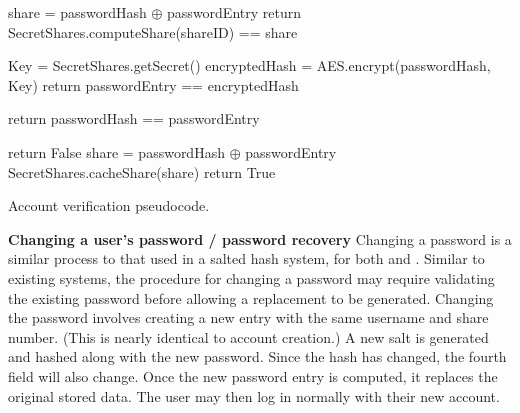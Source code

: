 \begin{algorithm}
\footnotesize
\begin{algorithmic}[1]

            \State share = passwordHash $\oplus$ passwordEntry 
            \State return SecretShares.computeShare(shareID) == share
        \Else {}

            \State {}
            \State Key = SecretShares.getSecret()
            \State encryptedHash = AES.encrypt(passwordHash, Key)
            \State return passwordEntry == encryptedHash

        \EndIf
        \vspace{.1cm}

    \Else {}

        \State {}
            \State return passwordHash == passwordEntry
        \EndIf 

            \State return False
        \EndIf 
            \State share = passwordHash $\oplus$ passwordEntry
            \State SecretShares.cacheShare(share)
        \EndIf
        \State return True

    \EndIf

    \EndFunction
\end{algorithmic}
\caption{\small Account verification pseudocode.\label{ALG:acc-verification}}
\end{algorithm}

{\bf Changing a user's password / password recovery} Changing a password
is a similar process to that used in a salted hash system, for both \thresholdaccounts
and \thresholdlessaccounts. Similar to existing systems, the procedure for
changing a password may require validating the existing password before
allowing a replacement to be generated. Changing the password involves creating
a new entry with the same username and share number. (This is nearly identical
to account creation.)  A new salt is generated and hashed along with the new
password.  Since the hash has changed, the fourth field will also change. Once
the new password entry is computed, it replaces the original stored data.  The
user may then log in normally with their new account.

